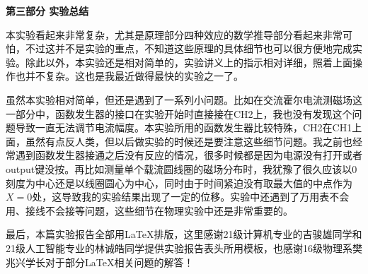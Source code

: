 \documentclass[12pt]{article}
\begin{document}
\newpage
\begin{center}
{\Large \textbf{第三部分 \quad 实验总结}}
\end{center}

本实验看起来非常复杂，尤其是原理部分四种效应的数学推导部分看起来非常可怕，不过这并不是实验的重点，不知道这些原理的具体细节也可以很方便地完成实验。除此以外，本实验还是相对简单的，实验讲义上的指示相对详细，照着上面操作也并不复杂。这也是我最近做得最快的实验之一了。

虽然本实验相对简单，但还是遇到了一系列小问题。比如在交流霍尔电流测磁场这一部分中，函数发生器的接口在实验开始时直接接在CH2上，我也没有发现这个问题导致一直无法调节电流幅度。本实验所用的函数发生器比较特殊，CH2在CH1上面，虽然有点反人类，但以后做实验的时候还是要注意这些细节问题。我之前也经常遇到函数发生器接通之后没有反应的情况，很多时候都是因为电源没有打开或者output键没按。再比如测量单个载流圆线圈的磁场分布时，我犹豫了很久应该以0刻度为中心还是以线圈圆心为中心，同时由于时间紧迫没有取最大值的中点作为$X=0$处，这导致我的实验结果出现了一定的位移。实验中还遇到了万用表不会用、接线不会接等问题，这些细节在物理实验中还是非常重要的。

最后，本篇实验报告全部用\LaTeX{}排版，这里感谢21级计算机专业的吉骏雄同学和21级人工智能专业的林诚皓同学提供实验报告表头所用模板，也感谢16级物理系樊兆兴学长对于部分\LaTeX{}相关问题的解答！
\end{document}
